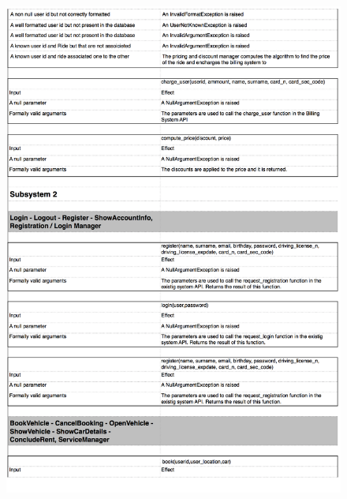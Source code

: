 \documentclass[a4paper,10pt]{article}
\begin{document}
    \begin{figure}[!h]
  \centering
    \includegraphics[scale=0.26]{Resources/6.png}
  \end{figure}
\end{document}
